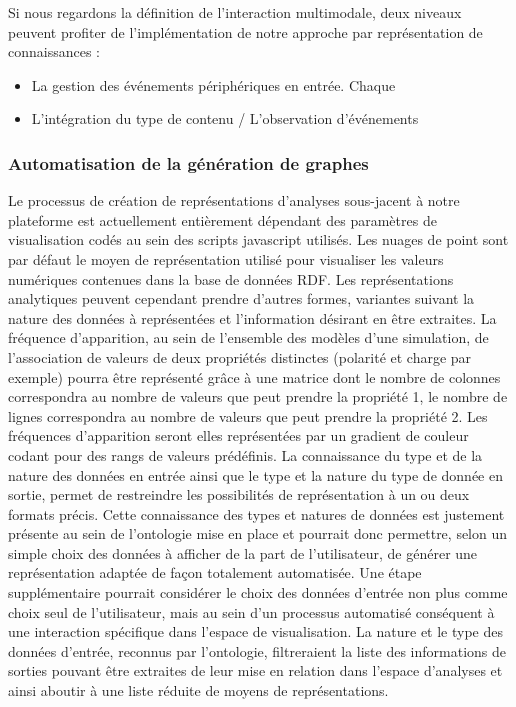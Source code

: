 Si nous regardons la définition de l'interaction multimodale, deux niveaux peuvent profiter de l'implémentation de notre approche par représentation de connaissances :

\begin{itemize}
	\item La gestion des événements périphériques en entrée. Chaque 
	\item L'intégration du type de contenu / L'observation d'événements
\end{itemize}



\subsubsection{Automatisation de la génération de graphes}

Le processus de création de représentations d'analyses sous-jacent à notre plateforme est actuellement entièrement dépendant des paramètres de visualisation codés au sein des scripts javascript utilisés. Les nuages de point sont par défaut le moyen de représentation utilisé pour visualiser les valeurs numériques contenues dans la base de données RDF. Les représentations analytiques peuvent cependant prendre d'autres formes, variantes suivant la nature des données à représentées et l'information désirant en être extraites. 
La fréquence d'apparition, au sein de l'ensemble des modèles d'une simulation, de l'association de valeurs de deux propriétés distinctes (polarité et charge par exemple) pourra être représenté grâce à une matrice dont le nombre de colonnes correspondra au nombre de valeurs que peut prendre la propriété 1, le nombre de lignes correspondra au nombre de valeurs que peut prendre la propriété 2. Les fréquences d'apparition seront elles représentées par un gradient de couleur codant pour des rangs de valeurs prédéfinis.
La connaissance du type et de la nature des données en entrée ainsi que le type et la nature du type de donnée en sortie, permet de restreindre les possibilités de représentation à un ou deux formats précis. Cette connaissance des types et natures de données est justement présente au sein de l'ontologie mise en place et pourrait donc permettre, selon un simple choix des données à afficher de la part de l'utilisateur, de générer une représentation adaptée de façon totalement automatisée. 
Une étape supplémentaire pourrait considérer le choix des données d'entrée non plus comme choix seul de l'utilisateur, mais au sein d'un processus automatisé conséquent à une interaction spécifique dans l'espace de visualisation. La nature et le type des données d'entrée, reconnus par l'ontologie, filtreraient la liste des informations de sorties pouvant être extraites de leur mise en relation dans l'espace d'analyses et ainsi aboutir à une liste réduite de moyens de représentations.

